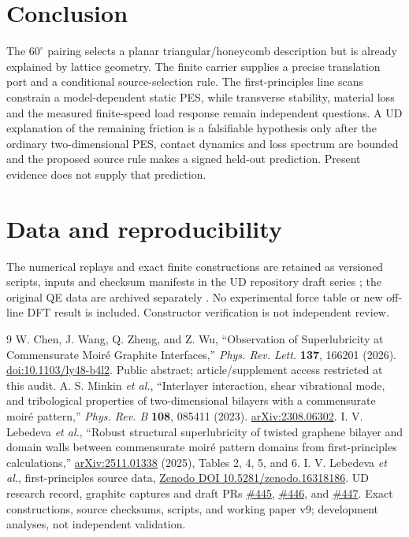 \documentclass[9pt,a4paper,twocolumn]{extarticle}
\begin{document}
\section{Conclusion}
The $60^\circ$ pairing selects a planar triangular/honeycomb description but is already explained by lattice geometry. The finite carrier supplies a precise translation port and a conditional source-selection rule. The first-principles line scans constrain a model-dependent static PES, while transverse stability, material loss and the measured finite-speed load response remain independent questions. A UD explanation of the remaining friction is a falsifiable hypothesis only after the ordinary two-dimensional PES, contact dynamics and loss spectrum are bounded and the proposed source rule makes a signed held-out prediction. Present evidence does not supply that prediction.

\section*{Data and reproducibility}
The numerical replays and exact finite constructions are retained as versioned scripts, inputs and checksum manifests in the UD repository draft series \cite{udrecord}; the original QE data are archived separately \cite{zenodo}. No experimental force table or new off-line DFT result is included. Constructor verification is not independent review.

\begin{thebibliography}{9}\setlength{\itemsep}{0pt}
 W. Chen, J. Wang, Q. Zheng, and Z. Wu, ``Observation of Superlubricity at Commensurate Moir\'e Graphite Interfaces,'' \emph{Phys. Rev. Lett.} \textbf{137}, 166201 (2026). \href{https://doi.org/10.1103/ly48-b4l2}{doi:10.1103/ly48-b4l2}. Public abstract; article/supplement access restricted at this audit.
 A. S. Minkin \emph{et al.}, ``Interlayer interaction, shear vibrational mode, and tribological properties of two-dimensional bilayers with a commensurate moir\'e pattern,'' \emph{Phys. Rev. B} \textbf{108}, 085411 (2023). \href{https://arxiv.org/abs/2308.06302}{arXiv:2308.06302}.
 I. V. Lebedeva \emph{et al.}, ``Robust structural superlubricity of twisted graphene bilayer and domain walls between commensurate moir\'e pattern domains from first-principles calculations,'' \href{https://arxiv.org/abs/2511.01338}{arXiv:2511.01338} (2025), Tables 2, 4, 5, and 6.
 I. V. Lebedeva \emph{et al.}, first-principles source data, \href{https://doi.org/10.5281/zenodo.16318186}{Zenodo DOI 10.5281/zenodo.16318186}.
 UD research record, graphite captures and draft PRs \href{https://github.com/ud-tetra/UD/pull/445}{\#445}, \href{https://github.com/ud-tetra/UD/pull/446}{\#446}, and \href{https://github.com/ud-tetra/UD/pull/447}{\#447}. Exact constructions, source checksums, scripts, and working paper v9; development analyses, not independent validation.
\end{thebibliography}
\end{document}
